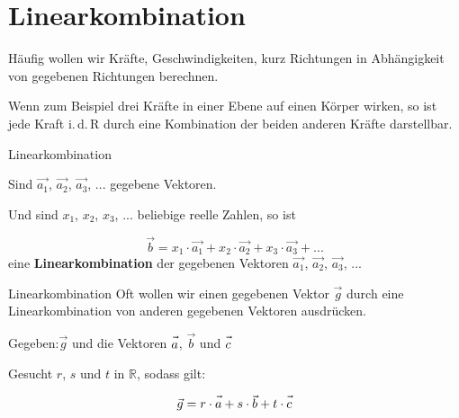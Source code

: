 \section{Linearkombination}


Häufig wollen wir Kräfte, Geschwindigkeiten, kurz Richtungen in
Abhängigkeit von gegebenen Richtungen berechnen.

Wenn zum Beispiel drei Kräfte in einer Ebene auf einen Körper wirken, so ist jede
Kraft i.\,d.\,R durch eine Kombination der beiden anderen Kräfte
darstellbar.

\begin{definition}{Linearkombination}{}

 
  Sind $\vec{a_1}$, $\vec{a_2}$, $\vec{a_3}$, ... gegebene Vektoren.

  Und sind $x_1$, $x_2$, $x_3$, ... beliebige reelle Zahlen, so ist

  $$\vec{b} = x_1\cdot{}\vec{a_1} +  x_2\cdot{}\vec{a_2} +
  x_3\cdot{}\vec{a_3} + ...$$
  eine \textbf{Linearkombination} der gegebenen Vektoren $\vec{a_1}$, $\vec{a_2}$, $\vec{a_3}$, ... 
\end{definition}


\begin{beispiel}{Linearkombination}{}
Oft wollen wir einen gegebenen Vektor $\vec{g}$ durch eine Linearkombination von
anderen gegebenen Vektoren ausdrücken.

Gegeben:$\vec{g}$ und die Vektoren $\vec{a\vphantom{b}}$, $\vec{b}$ und $\vec{c\vphantom{b}}$

Gesucht $r$, $s$ und $t$ in $\mathbb{R}$, sodass gilt:

$$\vec{g} = r\cdot{}\vec{a\vphantom{b}} + s\cdot{}\vec{b} + t\cdot{} \vec{c\vphantom{b}}$$


\end{beispiel}

\newpage

